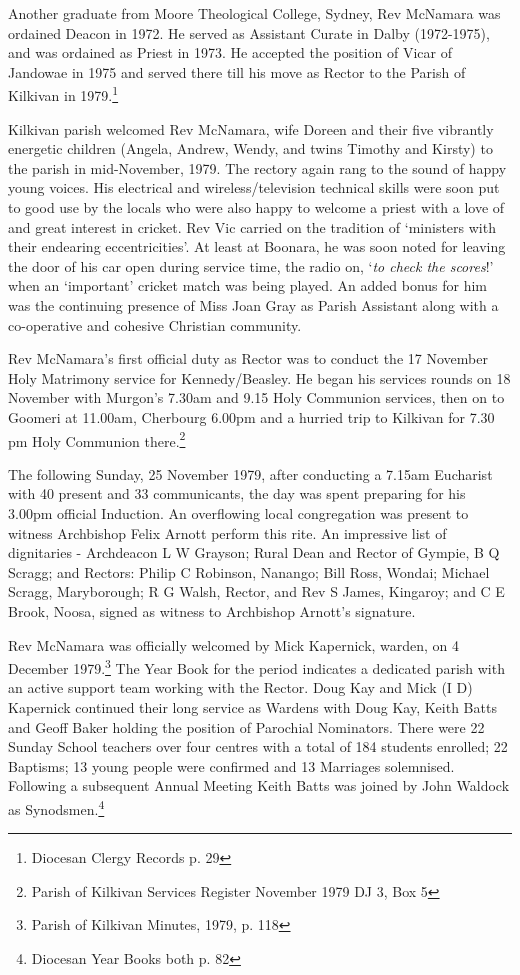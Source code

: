 Another graduate from Moore Theological College, Sydney, Rev McNamara
was ordained Deacon in 1972. He served as Assistant Curate in Dalby
(1972-1975), and was ordained as Priest in 1973. He accepted the
position of Vicar of Jandowae in 1975 and served there till his move as
Rector to the Parish of Kilkivan in 1979.\footnote{Diocesan Clergy
  Records p. 29}

Kilkivan parish welcomed Rev McNamara, wife Doreen and their five
vibrantly energetic children (Angela, Andrew, Wendy, and twins Timothy
and Kirsty) to the parish in mid-November, 1979. The rectory again rang
to the sound of happy young voices. His electrical and
wireless/television technical skills were soon put to good use by the
locals who were also happy to welcome a priest with a love of and great
interest in cricket. Rev Vic carried on the tradition of `ministers with
their endearing eccentricities'. At least at Boonara, he was soon noted
for leaving the door of his car open during service time, the radio on,
`\emph{to check the scores}!' when an `important' cricket match was
being played. An added bonus for him was the continuing presence of Miss
Joan Gray as Parish Assistant along with a co-operative and cohesive
Christian community.

Rev McNamara's first official duty as Rector was to conduct the 17
November Holy Matrimony service for Kennedy/Beasley. He began his
services rounds on 18 November with Murgon's 7.30am and 9.15 Holy
Communion services, then on to Goomeri at 11.00am, Cherbourg 6.00pm and
a hurried trip to Kilkivan for 7.30 pm Holy Communion there.\footnote{Parish
  of Kilkivan Services Register November 1979 DJ 3, Box 5}

The following Sunday, 25 November 1979, after conducting a 7.15am
Eucharist with 40 present and 33 communicants, the day was spent
preparing for his 3.00pm official Induction. An overflowing local
congregation was present to witness Archbishop Felix Arnott perform this
rite. An impressive list of dignitaries - Archdeacon L W Grayson; Rural
Dean and Rector of Gympie, B Q Scragg; and Rectors: Philip C Robinson,
Nanango; Bill Ross, Wondai; Michael Scragg, Maryborough; R G Walsh,
Rector, and Rev S James, Kingaroy; and C E Brook, Noosa, signed as
witness to Archbishop Arnott's signature.

Rev McNamara was officially welcomed by Mick Kapernick, warden, on 4
December 1979.\footnote{Parish of Kilkivan Minutes, 1979, p. 118} The
Year Book for the period indicates a dedicated parish with an active
support team working with the Rector. Doug Kay and Mick (I D) Kapernick
continued their long service as Wardens with Doug Kay, Keith Batts and
Geoff Baker holding the position of Parochial Nominators. There were 22
Sunday School teachers over four centres with a total of 184 students
enrolled; 22 Baptisms; 13 young people were confirmed and 13 Marriages
solemnised. Following a subsequent Annual Meeting Keith Batts was joined
by John Waldock as Synodsmen.\footnote{Diocesan Year Books both p. 82}

